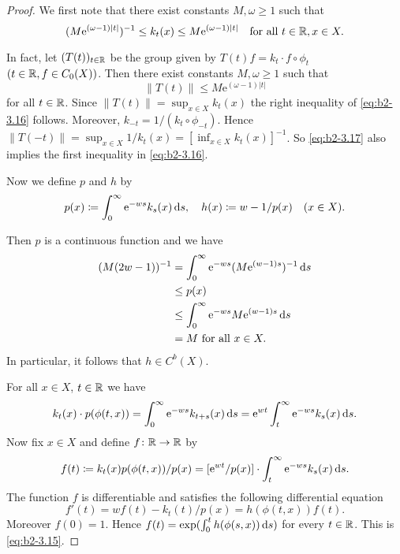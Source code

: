\begin{proof}
We first note that there exist constants $M, \omega \geq 1$ such that
\begin{equation}\label{eq:b2-3.16}
(M\mathrm{e}^{(\omega-1)|t|})^{-1} \leq k_{t}(x) \leq M\mathrm{e}^{(\omega-1)|t|} \quad \text{for all } t \in \mathbb{R}, x \in X.
\end{equation}

In fact, let $(T(t))_{t \in \mathbb{R}}$ be the group given by $T(t)f = k_{t} \cdot f \circ \phi_{t}$ $(t \in \mathbb{R}, f \in C_{0}(X))$.
Then there exist constants $M, \omega \geq 1$ such that
\begin{equation}\label{eq:b2-3.17}
\|T(t)\| \leq M\mathrm{e}^{(\omega-1)|t|}
\end{equation}
for all $t \in \mathbb{R}$.
Since $\|T(t)\| = \sup_{x \in X} k_{t}(x)$ the right inequality of
\eqref{eq:b2-3.16} follows.
Moreover, $k_{-t} = 1/(k_{t} \circ \phi_{-t})$.
Hence $\|T(-t)\| = \sup_{x \in X} 1/k_{t}(x) = [\inf_{x \in X} k_{t}(x)]^{-1}$.
So \eqref{eq:b2-3.17} also implies the first inequality in \eqref{eq:b2-3.16}.

Now we define $p$ and $h$ by
\[
p(x) \coloneqq \int_{0}^{\infty} \mathrm{e}^{-ws}k_{s}(x) \mathop{}\!\mathrm{d}{s}, \quad
h(x) \coloneqq w - 1/p(x) \quad (x \in X).
\]

Then $p$ is a continuous function and we have 
\begin{align*}
(M(2w - 1))^{-1} &= \int_{0}^{\infty} \mathrm{e}^{-ws}(M\mathrm{e}^{(w-1)s})^{-1} \mathop{}\!\mathrm{d}{s} \\ 
&\leq p(x) \\ 
&\leq \int_{0}^{\infty} \mathrm{e}^{-ws}M\mathrm{e}^{(w-1)s} \mathop{}\!\mathrm{d}{s} \\
&= M \text{ for all } x \in X.
\end{align*}
In particular, it follows that $h \in C^{b}(X)$.

For all $x \in X$, $t \in \mathbb{R}$ we have 
\[
k_{t}(x) \cdot p(\phi(t,x)) = \int_{0}^{\infty} \mathrm{e}^{-ws}k_{t+s}(x) \mathop{}\!\mathrm{d}{s} = \mathrm{e}^{wt} \int_{t}^{\infty} \mathrm{e}^{-ws}k_{s}(x) \mathop{}\!\mathrm{d}{s}.
\]
Now fix $x \in X$ and define $f \colon \mathbb{R} \to \mathbb{R}$ by 
\[
f(t) \coloneqq k_{t}(x)p(\phi(t,x))/p(x) = [\mathrm{e}^{wt}/p(x)] \cdot \int_{t}^{\infty} \mathrm{e}^{-ws}k_{s}(x)  \mathop{}\!\mathrm{d}{s}.
\]
The function $f$ is differentiable and satisfies the following differential equation 
\[
f'(t) = wf(t)  - k_{t}(t)/p(x)  = h(\phi(t,x))f(t).
\]
Moreover $f(0) = 1$.
Hence $f(t) = \exp(\int_{0}^{t} h(\phi(s,x)) \mathop{}\!\mathrm{d}{s})$ for every $t \in \mathbb{R}$.
This is \eqref{eq:b2-3.15}.
\end{proof}

